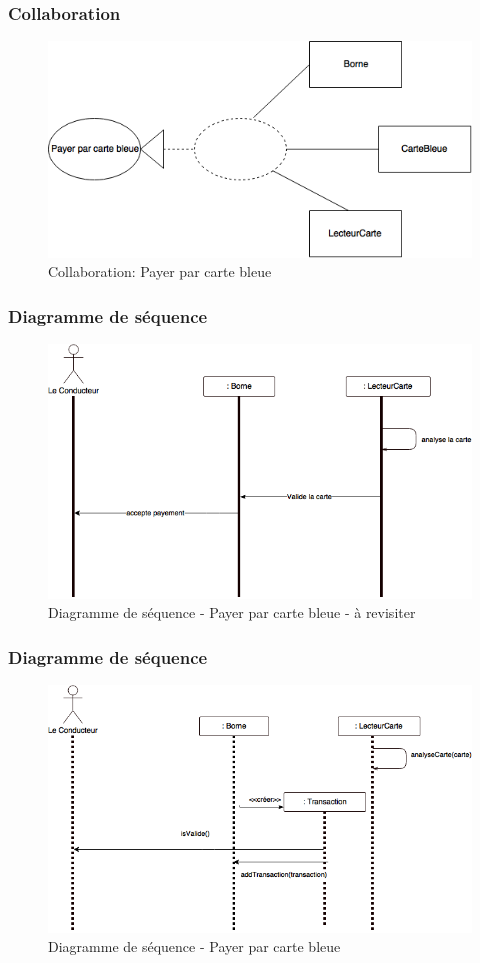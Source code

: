 \subsubsection{Collaboration}
\begin{figure}[h]
    \centering
    \includegraphics[scale=0.6]{02_Desenvolvimento/TD2/images/ColaCarteBleu.png}
    \caption{Collaboration: Payer par carte bleue}
\end{figure}
\newpage    
\subsubsection{Diagramme de séquence}
\begin{figure}[!htb]
    \centering
    \includegraphics[scale=0.5]{02_Desenvolvimento/TD2/images/DS-payerCarteBleu.png}
    \caption{Diagramme de séquence - Payer par carte bleue - à revisiter }
\end{figure}
\subsubsection{Diagramme de séquence}
\begin{figure}[!htb]
    \centering
    \includegraphics[scale=0.5]{02_Desenvolvimento/TD2/images/v2-DS-payerCarteBleu.png}
    \caption{Diagramme de séquence - Payer par carte bleue}
\end{figure}